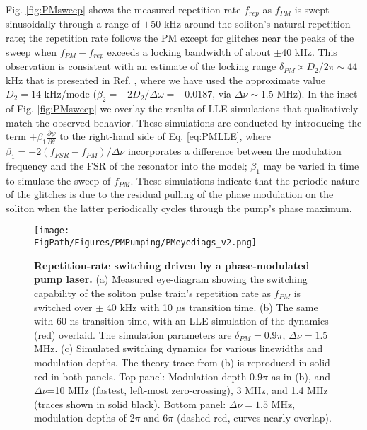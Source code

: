 Fig. \ref{fig:PMsweep} shows the measured repetition rate $f_{rep}$ as $f_{PM}$ is swept sinusoidally through a range of $\pm$50 kHz around the soliton's natural repetition rate; the repetition rate follows the PM except for glitches near the peaks of the sweep when $f_{PM}-f_{rep}$ exceeds a locking bandwidth of about $\pm$40 kHz. This observation is consistent with an estimate of the locking range $\delta_{PM}\times D_2/2\pi\sim$44 kHz that is presented in Ref. , where we have used the approximate value $D_2=14$ kHz/mode ($\beta_2=-2D_2/\Delta\omega=-0.0187$, via $\Delta\nu\sim$1.5 MHz). In the inset of Fig. \ref{fig:PMsweep} we overlay the results of LLE simulations that qualitatively match the observed behavior. These simulations are conducted by introducing the term $+\beta_1\frac{\partial\psi}{\partial\theta}$ to the right-hand side of Eq. \ref{eq:PMLLE}, where $\beta_1=-2(f_{FSR}-f_{PM})/\Delta\nu$ incorporates a difference between the modulation frequency and the FSR of the resonator into the model; $\beta_1$ may be varied in time to simulate the sweep of $f_{PM}$. These simulations indicate that the periodic nature of the glitches is due to the residual pulling of the phase modulation on the soliton when the latter periodically cycles through the pump's phase maximum.



\begin{figure}[htpb]
	\begin{center}
		\texttt{[image: \\FigPath/Figures/PMPumping/PMeyediags\_v2.png]}
	\end{center}
	\caption[Repetition-rate switching driven by a phase-modulated pump laser]{\textbf{Repetition-rate switching driven by a phase-modulated pump laser.} (a) Measured eye-diagram showing the switching capability of the soliton pulse train's repetition rate as $f_{PM}$ is switched over $\pm$ 40 kHz with 10 $\mu$s transition time. (b) The same with 60 ns transition time, with an LLE simulation of the dynamics (red) overlaid. The simulation parameters are $\delta_{PM}=0.9\pi$, $\Delta\nu=1.5$ MHz. (c) Simulated switching dynamics for various linewidths and modulation depths. The theory trace from (b) is reproduced in solid red in both panels.  Top panel: Modulation depth $0.9\pi$ as in (b), and $\Delta\nu$=10 MHz (fastest, left-most zero-crossing), 3 MHz, and 1.4 MHz (traces shown in solid black). Bottom panel: $\Delta\nu=1.5$ MHz, modulation depths of $2\pi$ and $6\pi$ (dashed red, curves nearly overlap). }
	\label{fig:PMeyediags}
\end{figure} 

